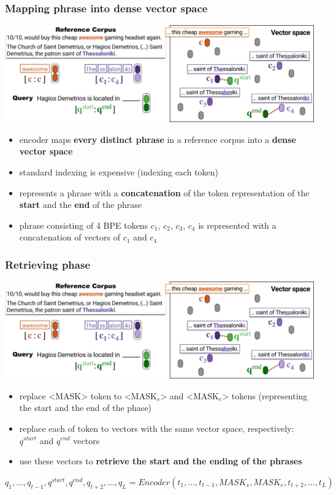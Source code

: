 \documentclass{beamer}
\begin{document}
\begin{frame}
    \frametitle{Mapping phrase into dense vector space}
    \begin{center}
        \includegraphics[scale=0.6]{img/npm2.png}
    \end{center}
    \begin{itemize}
        \footnotesize
        \item encoder maps \textbf{every distinct phrase} in a reference corpus into a \textbf{dense vector space}
        \item standard indexing is expensive (indexing each token)
        \item represents a phrase with a \textbf{concatenation} of the token representation of the \textbf{start} and the \textbf{end} of the phrase
        \item phrase consisting of 4 BPE tokens $c_1$, $c_2$, $c_3$, $c_4$ is represented with a concatenation of vectors of $c_1$ and $c_4$
    \end{itemize}
\end{frame}

\begin{frame}
    \frametitle{Retrieving phase}
    \begin{center}
        \includegraphics[scale=0.6]{img/npm2.png}
    \end{center}
    \begin{itemize}
        \footnotesize
        \item replace <MASK> token to <MASK$_{s}$> and <MASK$_{e}$> tokens (representing the start and the end of the phase)
        \item replace each of token to vectors with the same vector space, respectively: $q^{start}$ and $q^{end}$ vectors
        \item use these vectors to \textbf{retrieve the start and the ending of the phrases}
    \end{itemize}
    \begin{center}
    $ q_{1}, ..., q_{t-1}, q^{start}, q^{end}, q_{t+2}, ..., q_{L} = Encoder (t_{1}, ..., t_{t-1}, MASK_{s}, MASK_{e}, t_{t+2}, ..., t_{L}) $
    \end{center}
\end{frame}
\end{document}

